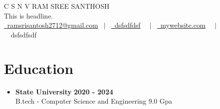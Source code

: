 \documentclass[letterpaper,5pt]{article}
\begin{document}
    

    
    \begin{center}
        {\Huge \scshape C S N V RAM SREE SANTHOSH} \\ \vspace{1pt}
        \large This is headline. \\ \vspace{1pt}
        \href{mailto:ramsrisantosh2712@gmail.com}{\raisebox{-0.05\height}\faEnvelope \ ramsrisantosh2712@gmail.com} 
        \ $|$ \ \href{tel:dsfsdfdsf}{\raisebox{-0.05\height}\faMobile \ dsfsdfdsf}  \
        \ $|$ \ \href{mywebsite.com}{\raisebox{-0.05\height}\faGlobe \ mywebsite.com}  \
        \ $|$ \ {\raisebox{-0.05\height}\faMapMarker \ dsfsdfsdf} \ \  
        \vspace{-8pt}
    \end{center}
    
   \section{\textbf{Education}}
    
      
          \begin{itemize}[leftmargin=0in, label={}]
          \item
            \textbf{State University} \hfill \textbf{2020 - 2024} \\
            B.tech - Computer Science and Engineering \hfill 9.0 Gpa
          \end{itemize}
        
    
    

    
    \vspace*{-4mm}
\end{document}
